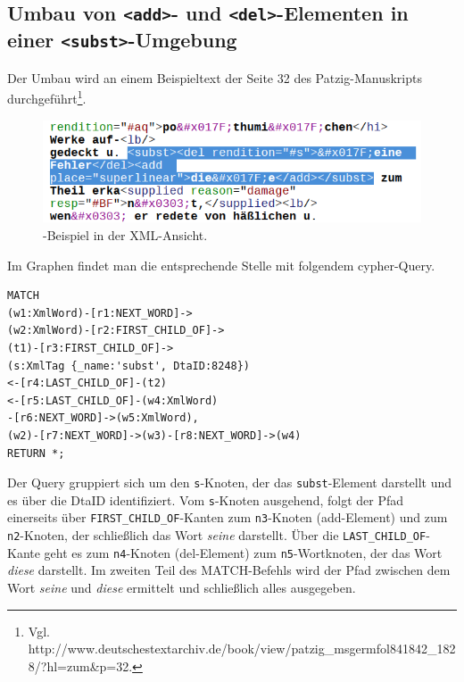 \documentclass[ngerman,]{scrreprt}
\begin{document}
\subsection{\texorpdfstring{Umbau von \texttt{\textless{}add\textgreater{}}- und \texttt{\textless{}del\textgreater{}}-Elementen in einer \texttt{\textless{}subst\textgreater{}}-Umgebung}{Umbau von \textless{}add\textgreater{}- und \textless{}del\textgreater{}-Elementen in einer \textless{}subst\textgreater{}-Umgebung}}\label{umbau-von-add--und-del-elementen-in-einer-subst-umgebung}

Der Umbau wird an einem Beispieltext der Seite 32 des Patzig-Manuskripts durchgeführt\footnote{Vgl. http://www.deutschestextarchiv.de/book/view/patzig\_msgermfol841842\_1828/?hl=zum\&p=32.}.

\begin{figure}
\centering
\includegraphics{Bilder/TEI2Graph/subst-xml-Beispiel.png}
\caption{-Beispiel in der XML-Ansicht.}
\end{figure}

Im Graphen findet man die entsprechende Stelle mit folgendem cypher-Query.

\begin{verbatim}
MATCH
(w1:XmlWord)-[r1:NEXT_WORD]->
(w2:XmlWord)-[r2:FIRST_CHILD_OF]->
(t1)-[r3:FIRST_CHILD_OF]->
(s:XmlTag {_name:'subst', DtaID:8248})
<-[r4:LAST_CHILD_OF]-(t2)
<-[r5:LAST_CHILD_OF]-(w4:XmlWord)
-[r6:NEXT_WORD]->(w5:XmlWord),
(w2)-[r7:NEXT_WORD]->(w3)-[r8:NEXT_WORD]->(w4)
RETURN *;
\end{verbatim}

Der Query gruppiert sich um den \texttt{s}-Knoten, der das \texttt{subst}-Element darstellt und es über die DtaID identifiziert. Vom \texttt{s}-Knoten ausgehend, folgt der Pfad einerseits über \texttt{FIRST\_CHILD\_OF}-Kanten zum \texttt{n3}-Knoten (add-Element) und zum \texttt{n2}-Knoten, der schließlich das Wort \emph{seine} darstellt. Über die \texttt{LAST\_CHILD\_OF}-Kante geht es zum \texttt{n4}-Knoten (del-Element) zum \texttt{n5}-Wortknoten, der das Wort \emph{diese} darstellt. Im zweiten Teil des MATCH-Befehls wird der Pfad zwischen dem Wort \emph{seine} und \emph{diese} ermittelt und schließlich alles ausgegeben.
\end{document}
